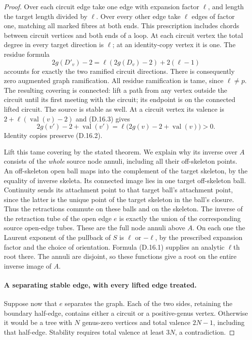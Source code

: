 \begin{proof}
Over each circuit edge take one edge with expansion factor
$\ell$, and length the target length divided by $\ell$.
Over every other edge take $\ell$ edges of factor one, matching
all marked fibres at both ends. This prescription includes chords
between circuit vertices and both ends of a loop. At each circuit
vertex the total degree in every target direction is $\ell$;
at an identity-copy vertex it is one. The residue formula
\[
       2g(D'_v)-2=\ell(2g(D_v)-2)+2(\ell-1)
 \tag{D.16.3}
\]
accounts for exactly the two ramified circuit directions.
There is consequently zero augmented graph ramification.
All residue ramification is tame, since $\ell\ne p$.
The resulting covering is connected: lift a path from any vertex
outside the circuit until its first meeting with the circuit;
its endpoint is on the connected lifted circuit. The source is
stable as well. At a circuit vertex its valence is
$2+\ell(\operatorname{val}(v)-2)$ and (D.16.3) gives
\[
 2g(v')-2+\operatorname{val}(v')
       =\ell\bigl(2g(v)-2+\operatorname{val}(v)\bigr)>0.
\]
Identity copies preserve (D.16.2).

Lift this tame covering by the stated theorem. We explain why its
inverse over $A$ consists of the \emph{whole} source node annuli,
including all their off-skeleton points. An off-skeleton open ball
maps into the complement of the target skeleton, by the equality
of inverse skeleta. Its connected image lies in one target
off-skeleton ball. Continuity sends its attachment point to that
target ball's attachment point, since the latter is the unique
point of the target skeleton in the ball's closure. Thus the
retractions commute on these balls and on the skeleton.
The inverse of the retraction tube of the open edge $e$ is exactly
the union of the corresponding source open-edge tubes. These are
the full node annuli above $A$.
On each one the Laurent exponent of the pullback of $S$ is
$\ell$ or $-\ell$, by the prescribed expansion factor and the
choice of orientation. Formula (D.16.1) supplies an analytic
$\ell$th root there. The annuli are disjoint, so these functions
give a root on the entire inverse image of $A$.

\paragraph{A separating stable edge, with every lifted edge treated.}
Suppose now that $e$ separates the graph. Each of the two sides,
retaining the boundary half-edge, contains either a circuit or a
positive-genus vertex. Otherwise it would be a tree with $N$
genus-zero vertices and total valence $2N-1$, including that
half-edge. Stability requires total valence at least $3N$, a
contradiction.


\end{proof}
